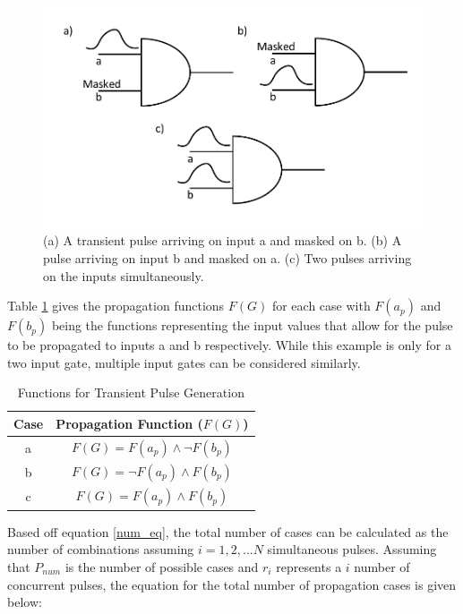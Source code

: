 \begin{figure}[!htbp]
	\centering
	\includegraphics[width=0.80\linewidth]{Figures/Prop_MET}
	\caption{(a) A transient pulse arriving on input a and masked on b. (b) A pulse arriving on input b and masked on a. (c) Two pulses arriving on the inputs simultaneously.}
	\label{Prop_MET}
\end{figure}

Table \ref{table:prop_table} gives the propagation functions $F(G)$ for each case with $F(a_p)$ and $F(b_p)$ being the functions representing the input values that allow for the pulse to be propagated to inputs a and b respectively. While this example is only for a two input gate, multiple input gates can be considered similarly.

\begin{table}[h]
	\begin{center}
		\caption{Functions for Transient Pulse Generation}
		\label{table:prop_table}
		\begin{tabular}{|c|c|}
			\hline
			Case & Propagation Function ($F(G)$) \\ 
			\hline
			a & $F(G) = F(a_p) \land \lnot F(b_p)$ \\
			\hline
			b & $F(G) = \lnot F(a_p) \land F(b_p)$ \\
			\hline
			c & $F(G) = F(a_p) \land F(b_p)$ \\
			\hline
		\end{tabular}
	\end{center}
\end{table}

Based off equation \ref{num_eq}, the total number of cases can be calculated as the number of combinations assuming $i = 1,2,...N$ simultaneous pulses. Assuming that $P_{num}$ is the number of possible cases and $r_i$ represents a $i$ number of concurrent pulses, the equation for the total number of propagation cases is given below:

